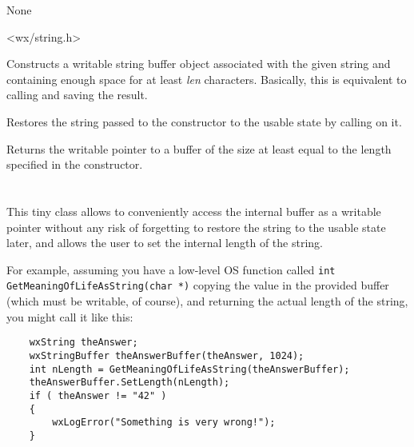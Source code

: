 
None


<wx/string.h>


\label{wxstringbufferctor}


Constructs a writable string buffer object associated with the given string
and containing enough space for at least {\it len} characters. Basically, this
is equivalent to calling  and
saving the result.

\label{wxstringbufferdtor}


Restores the string passed to the constructor to the usable state by calling 
 on it.

\label{wxstringbufferwxchar}


Returns the writable pointer to a buffer of the size at least equal to the
length specified in the constructor.



\section{}\label{wxstringbufferlength}

This tiny class allows to conveniently access the  
internal buffer as a writable pointer without any risk of forgetting to restore
the string to the usable state later, and allows the user to set the internal
length of the string.

For example, assuming you have a low-level OS function called 
{\tt int GetMeaningOfLifeAsString(char *)} copying the value in the provided
buffer (which must be writable, of course), and returning the actual length
of the string, you might call it like this:

\begin{verbatim}
    wxString theAnswer;
    wxStringBuffer theAnswerBuffer(theAnswer, 1024);
    int nLength = GetMeaningOfLifeAsString(theAnswerBuffer);
    theAnswerBuffer.SetLength(nLength);
    if ( theAnswer != "42" )
    {
        wxLogError("Something is very wrong!");
    }
\end{verbatim}

